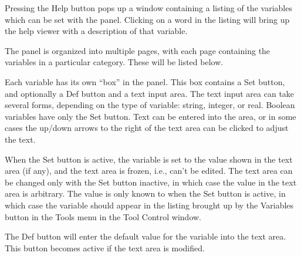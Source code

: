 Pressing the {\cb Help} button pops up a window containing a listing
of the variables which can be set with the panel.  Clicking on a word
in the listing will bring up the help viewer with a description of
that variable.

The panel is organized into multiple pages, with each page containing
the variables in a particular category.  These will be listed below.

Each variable has its own ``box'' in the panel.  This box contains a
{\cb Set} button, and optionally a {\cb Def} button and a text input
area.  The text input area can take several forms, depending on the
type of variable:  string, integer, or real.  Boolean variables have
only the {\cb Set} button.  Text can be entered into the area, or in
some cases the up/down arrows to the right of the text area can be
clicked to adjust the text.

When the {\cb Set} button is active, the variable is set to the value
shown in the text area (if any), and the text area is frozen, i.e.,
can't be edited.  The text area can be changed only with the {\cb Set}
button inactive, in which case the value in the text area is
arbitrary.  The value is only known to {\WRspice} when the {\cb Set}
button is active, in which case the variable should appear in the
listing brought up by the {\cb Variables} button in the {\cb Tools}
menu in the {\cb Tool Control} window.

The {\cb Def} button will enter the default value for the variable
into the text area.  This button becomes active if the text area is
modified.

